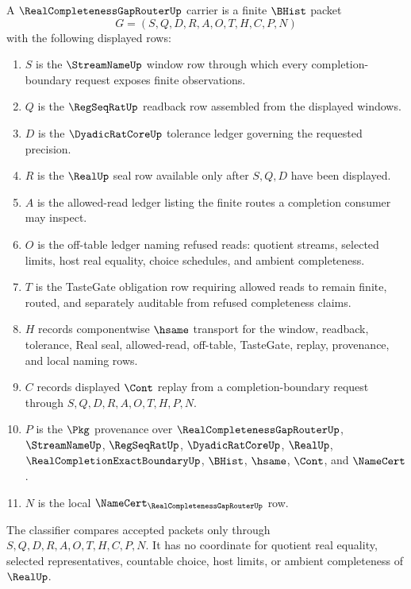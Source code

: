 \begin{definition}
\label{def:real-completeness-gap-router-carrier}
A $\RealCompletenessGapRouterUp$ carrier is a finite $\BHist$ packet
$$
G=(S,Q,D,R,A,O,T,H,C,P,N)
$$
with the following displayed rows:
\begin{enumerate}
\item $S$ is the $\StreamNameUp$ window row through which every completion-boundary request exposes finite observations.
\item $Q$ is the $\RegSeqRatUp$ readback row assembled from the displayed windows.
\item $D$ is the $\DyadicRatCoreUp$ tolerance ledger governing the requested precision.
\item $R$ is the $\RealUp$ seal row available only after $S,Q,D$ have been displayed.
\item $A$ is the allowed-read ledger listing the finite routes a completion consumer may inspect.
\item $O$ is the off-table ledger naming refused reads: quotient streams, selected limits, host real equality, choice schedules, and ambient completeness.
\item $T$ is the TasteGate obligation row requiring allowed reads to remain finite, routed, and separately auditable from refused completeness claims.
\item $H$ records componentwise $\hsame$ transport for the window, readback, tolerance, Real seal, allowed-read, off-table, TasteGate, replay, provenance, and local naming rows.
\item $C$ records displayed $\Cont$ replay from a completion-boundary request through $S,Q,D,R,A,O,T,H,P,N$.
\item $P$ is the $\Pkg$ provenance over $\RealCompletenessGapRouterUp$, $\StreamNameUp$, $\RegSeqRatUp$, $\DyadicRatCoreUp$, $\RealUp$, $\RealCompletionExactBoundaryUp$, $\BHist$, $\hsame$, $\Cont$, and $\NameCert$.
\item $N$ is the local $\NameCert_{\RealCompletenessGapRouterUp}$ row.
\end{enumerate}
The classifier compares accepted packets only through $S,Q,D,R,A,O,T,H,C,P,N$. It has no coordinate for quotient real equality, selected representatives, countable choice, host limits, or ambient completeness of $\RealUp$.
\end{definition}

